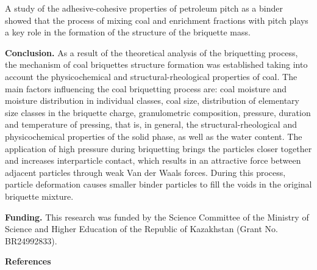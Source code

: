 \begin{multicols}{2}
A study of the adhesive-cohesive properties of petroleum pitch as a
binder showed that the process of mixing coal and enrichment fractions
with pitch plays a key role in the formation of the structure of the
briquette mass.

{\bfseries Conclusion.} As a result of the theoretical analysis of the
briquetting process, the mechanism of coal briquettes structure
formation was established taking into account the physicochemical and
structural-rheological properties of coal. The main factors influencing
the coal briquetting process are: coal moisture and moisture
distribution in individual classes, coal size, distribution of
elementary size classes in the briquette charge, granulometric
composition, pressure, duration and temperature of pressing, that is, in
general, the structural-rheological and physicochemical properties of
the solid phase, as well as the water content. The application of high
pressure during briquetting brings the particles closer together and
increases interparticle contact, which results in an attractive force
between adjacent particles through weak Van der Waals forces. During
this process, particle deformation causes smaller binder particles to
fill the voids in the original briquette mixture.

{\bfseries Funding.} This research was funded by the Science Committee
of the Ministry of Science and Higher Education of the Republic of
Kazakhstan (Grant No. BR24992833).
\end{multicols}

\begin{center}
{\bfseries References}
\end{center}

